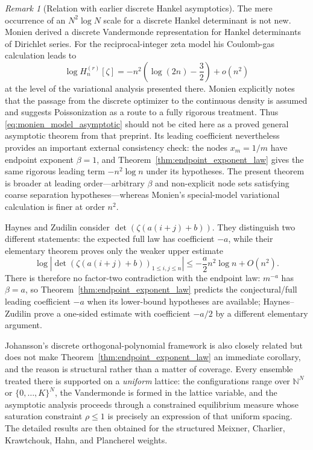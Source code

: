 \documentclass[11pt]{amsart}
\numberwithin{equation}{section}
\theoremstyle{plain}
\theoremstyle{definition}
\theoremstyle{remark}
\newtheorem{remark}[theorem]{Remark}
\begin{document}
\begin{remark}[Relation with earlier discrete Hankel asymptotics]
\label{rem:monien_haynes_position}
The mere occurrence of an $N^2\log N$ scale for a discrete Hankel determinant is not new. Monien \cite{Monien2009} derived a discrete Vandermonde representation for Hankel determinants of Dirichlet series.  For the reciprocal-integer zeta model his Coulomb-gas calculation leads to
\begin{equation}
\log H_n^{(r)}[\zeta]
=-n^2\left(\log(2n)-\frac32\right)+o(n^2)
\label{eq:monien_model_asymptotic}
\end{equation}
at the level of the variational analysis presented there.  Monien explicitly notes that the passage from the discrete optimizer to the continuous density is assumed and suggests Poissonization as a route to a fully rigorous treatment.  Thus \eqref{eq:monien_model_asymptotic} should not be cited here as a proved general asymptotic theorem from that preprint.  Its leading coefficient nevertheless provides an important external consistency check: the nodes $x_m=1/m$ have endpoint exponent $\beta=1$, and Theorem~\ref{thm:endpoint_exponent_law} gives the same rigorous leading term $-n^2\log n$ under its hypotheses.  The present theorem is broader at leading order---arbitrary $\beta$ and non-explicit node sets satisfying coarse separation hypotheses---whereas Monien's special-model variational calculation is finer at order $n^2$.

Haynes and Zudilin \cite{HaynesZudilin2015} consider $\det(\zeta(a(i+j)+b))$.  They distinguish two different statements: the expected full law has coefficient $-a$, while their elementary theorem proves only the weaker upper estimate
\begin{equation}
\log\left|\det(\zeta(a(i+j)+b))_{1\le i,j\le n}\right|
\le-\frac a2 n^2\log n+O(n^2).
\end{equation}
There is therefore no factor-two contradiction with the endpoint law: $m^{-a}$ has $\beta=a$, so Theorem~\ref{thm:endpoint_exponent_law} predicts the conjectural/full leading coefficient $-a$ when its lower-bound hypotheses are available; Haynes--Zudilin prove a one-sided estimate with coefficient $-a/2$ by a different elementary argument.

Johansson's discrete orthogonal-polynomial framework \cite{Johansson2001} is also closely related but does not make Theorem~\ref{thm:endpoint_exponent_law} an immediate corollary, and the reason is structural rather than a matter of coverage.  Every ensemble treated there is supported on a \emph{uniform} lattice: the configurations range over $\mathbb N^N$ or $\{0,\dots,K\}^N$, the Vandermonde is formed in the lattice variable, and the asymptotic analysis proceeds through a constrained equilibrium measure whose saturation constraint $\rho\le1$ is precisely an expression of that uniform spacing.  The detailed results are then obtained for the structured Meixner, Charlier, Krawtchouk, Hahn, and Plancherel weights.


\end{remark}
\end{document}
